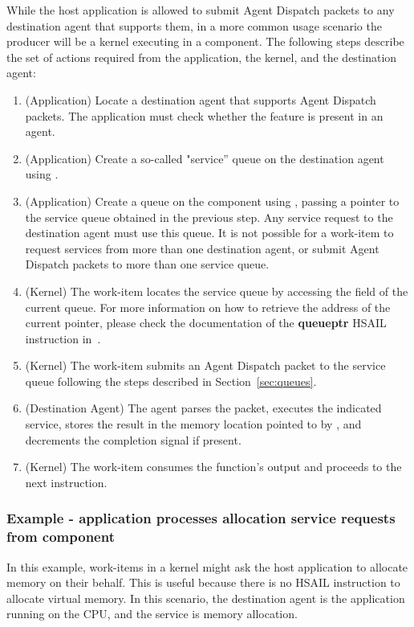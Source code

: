 \documentclass[final,oneside]{book}
\newcommand{\reffun}[1]{\textbf{#1}}
\newcommand{\refhsl}[1]{\reffun{#1}}
\begin{document}
While the host application is allowed to submit Agent Dispatch packets to any
destination agent that supports them, in a more common usage scenario the
producer will be a kernel executing in a component. The following steps describe
the set of actions required from the application, the kernel, and the
destination agent:
\begin{enumerate}[itemsep=1pt,topsep=3pt,partopsep=0pt]
\item (Application) Locate a destination agent that supports Agent Dispatch
  packets. The application must check whether the feature
   is present in an agent.
\item (Application) Create a so-called "service'' queue on the destination agent
  using .
\item (Application) Create a queue on the component using
  , passing a pointer to the service queue obtained in
  the previous step.  Any service request to the destination agent must use this
  queue. It is not possible for a work-item to request services from more than
  one destination agent, or submit Agent Dispatch packets to more than one
  service queue.
\item (Kernel) The work-item locates the service queue by accessing the
   field of the current queue. For more
  information on how to retrieve the address of the current pointer, please
  check the documentation of the \refhsl{queueptr} HSAIL instruction
  in~\cite{prm}.
\item (Kernel) The work-item submits an Agent Dispatch packet to the service
  queue following the steps described in Section~\ref{sec:queues}.
\item (Destination Agent) The agent parses the packet, executes the indicated
  service, stores the result in the memory location pointed to by
  , and decrements the
  completion signal if present.
\item (Kernel) The work-item consumes the function's output and proceeds to the
  next instruction.
\end{enumerate}

\subsubsection{Example - application processes allocation service requests from
  component}
In this example, work-items in a kernel might ask the host application to
allocate memory on their behalf. This is useful because there is no HSAIL
instruction to allocate virtual memory. In this scenario, the destination agent
is the application running on the CPU, and the service is memory allocation.
\end{document}
